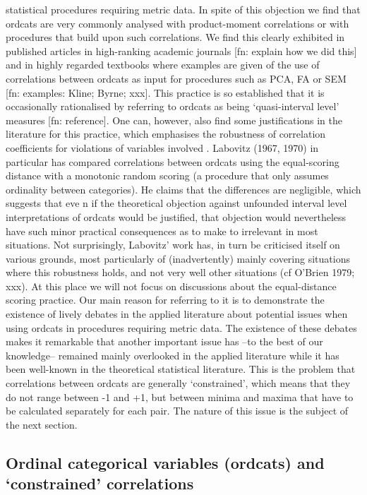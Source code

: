 \documentclass[
  12pt,
]{article}
\theoremstyle{plain}
\theoremstyle{definition}
\theoremstyle{remark}
\begin{document}
statistical procedures requiring metric data. In spite of this objection
we find that ordcats are very commonly analysed with product-moment
correlations or with procedures that build upon such correlations. We
find this clearly exhibited in published articles in high-ranking
academic journals {[}fn: explain how we did this{]} and in highly
regarded textbooks where examples are given of the use of correlations
between ordcats as input for procedures such as PCA, FA or SEM {[}fn:
examples: Kline; Byrne; xxx{]}. This practice is so established that it
is occasionally rationalised by referring to ordcats as being
`quasi-interval level' measures {[}fn: reference{]}. One can, however,
also find some justifications in the literature for this practice, which
emphasises the robustness of correlation coefficients for violations of
variables involved . Labovitz (1967, 1970) in particular has compared
correlations between ordcats using the equal-scoring distance with a
monotonic random scoring (a procedure that only assumes ordinality
between categories). He claims that the differences are negligible,
which suggests that eve n if the theoretical objection against unfounded
interval level interpretations of ordcats would be justified, that
objection would nevertheless have such minor practical consequences as
to make to irrelevant in most situations. Not surprisingly, Labovitz'
work has, in turn be criticised itself on various grounds, most
particularly of (inadvertently) mainly covering situations where this
robustness holds, and not very well other situations (cf O'Brien 1979;
xxx). At this place we will not focus on discussions about the
equal-distance scoring practice. Our main reason for referring to it is
to demonstrate the existence of lively debates in the applied literature
about potential issues when using ordcats in procedures requiring metric
data. The existence of these debates makes it remarkable that another
important issue has --to the best of our knowledge-- remained mainly
overlooked in the applied literature while it has been well-known in the
theoretical statistical literature. This is the problem that
correlations between ordcats are generally `constrained', which means
that they do not range between -1 and +1, but between minima and maxima
that have to be calculated separately for each pair. The nature of this
issue is the subject of the next section.

\subsection{Ordinal categorical variables (ordcats) and `constrained'
correlations}\label{ordinal-categorical-variables-ordcats-and-constrained-correlations}
\end{document}
